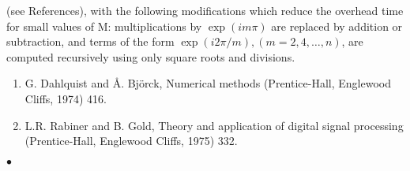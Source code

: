 (see References), with the following modifications which reduce the
overhead time for small values of M: multiplications by
$\exp(im\pi)$
are replaced by addition or subtraction, and terms of the form
$\exp(i2\pi/m),(m=2,4,\ldots,n)$, are computed recursively using only
square roots and divisions.
\Refer
\begin{enumerate}
\item  G. Dahlquist and \AA. Bj\"orck, Numerical methods
(Prentice-Hall, Englewood Cliffs, 1974) 416.
\item  L.R. Rabiner and B. Gold, Theory and application of
digital signal processing (Prentice-Hall, Englewood Cliffs, 1975) 332.
\end{enumerate}
$\bullet$
